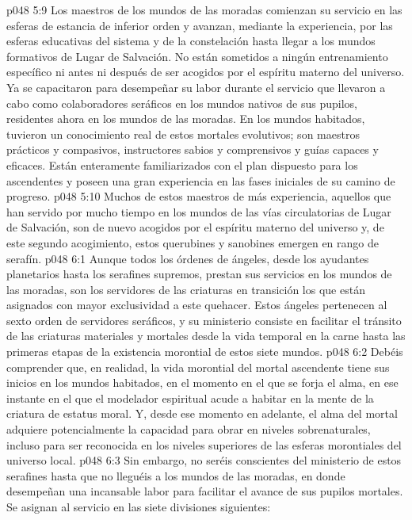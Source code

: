 \vs p048 5:9 \pc Los maestros de los mundos de las moradas comienzan su servicio en las esferas de estancia de inferior orden y avanzan, mediante la experiencia, por las esferas educativas del sistema y de la constelación hasta llegar a los mundos formativos de Lugar de Salvación. No están sometidos a ningún entrenamiento específico ni antes ni después de ser acogidos por el espíritu materno del universo. Ya se capacitaron para desempeñar su labor durante el servicio que llevaron a cabo como colaboradores seráficos en los mundos nativos de sus pupilos, residentes ahora en los mundos de las moradas. En los mundos habitados, tuvieron un conocimiento real de estos mortales evolutivos; son maestros prácticos y compasivos, instructores sabios y comprensivos y guías capaces y eficaces. Están enteramente familiarizados con el plan dispuesto para los ascendentes y poseen una gran experiencia en las fases iniciales de su camino de progreso.
\vs p048 5:10 Muchos de estos maestros de más experiencia, aquellos que han servido por mucho tiempo en los mundos de las vías circulatorias de Lugar de Salvación, son de nuevo acogidos por el espíritu materno del universo y, de este segundo acogimiento, estos querubines y sanobines emergen en rango de serafín.
\vs p048 6:1 Aunque todos los órdenes de ángeles, desde los ayudantes planetarios hasta los serafines supremos, prestan sus servicios en los mundos de las moradas, son los servidores de las criaturas en transición los que están asignados con mayor exclusividad a este quehacer. Estos ángeles pertenecen al sexto orden de servidores seráficos, y su ministerio consiste en facilitar el tránsito de las criaturas materiales y mortales desde la vida temporal en la carne hasta las primeras etapas de la existencia morontial de estos siete mundos.
\vs p048 6:2 Debéis comprender que, en realidad, la vida morontial del mortal ascendente tiene sus inicios en los mundos habitados, en el momento en el que se forja el alma, en ese instante en el que el modelador espiritual acude a habitar en la mente de la criatura de estatus moral. Y, desde ese momento en adelante, el alma del mortal adquiere potencialmente la capacidad para obrar en niveles sobrenaturales, incluso para ser reconocida en los niveles superiores de las esferas morontiales del universo local.
\vs p048 6:3 \pc Sin embargo, no seréis conscientes del ministerio de estos serafines hasta que no lleguéis a los mundos de las moradas, en donde desempeñan una incansable labor para facilitar el avance de sus pupilos mortales. Se asignan al servicio en las siete divisiones siguientes:
